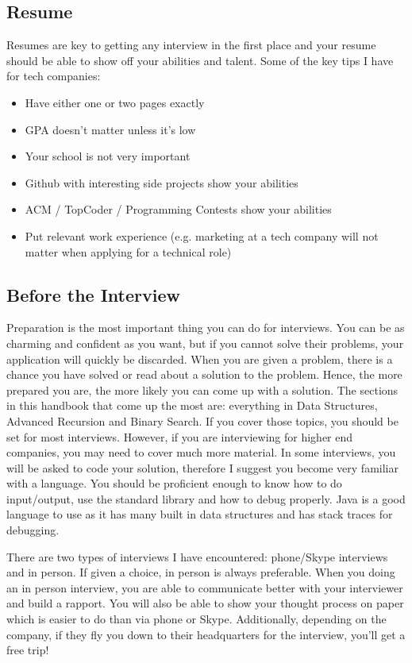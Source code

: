 \documentclass[11pt,oneside]{book}
\begin{document}
\subsection{Resume}

Resumes are key to getting any interview in the first place and your resume should be able to show off your abilities and talent. Some of the key tips I have for tech companies:

\begin{itemize}
\item Have either one or two pages exactly
\item GPA doesn't matter unless it's low
\item Your school is not very important
\item Github with interesting side projects show your abilities
\item ACM / TopCoder / Programming Contests show your abilities
\item Put relevant work experience (e.g. marketing at a tech company will not matter when applying for a technical role)
\end{itemize}

\subsection{Before the Interview}

Preparation is the most important thing you can do for interviews. You can be as charming and confident as you want, but if you cannot solve their problems, your application will quickly be discarded. When you are given a problem, there is a chance you have solved or read about a solution to the problem. Hence, the more prepared you are, the more likely you can come up with a solution. The sections in this handbook that come up the most are: everything in Data Structures, Advanced Recursion and Binary Search. If you cover those topics, you should be set for most interviews. However, if you are interviewing for higher end companies, you may need to cover much more material. In some interviews, you will be asked to code your solution, therefore I suggest you become very familiar with a language. You should be proficient enough to know how to do input/output, use the standard library and how to debug properly. Java is a good language to use as it has many built in data structures and has stack traces for debugging.

There are two types of interviews I have encountered: phone/Skype interviews and in person. If given a choice, in person is always preferable. When you doing an in person interview, you are able to communicate better with your interviewer and build a rapport. You will also be able to show your thought process on paper which is easier to do than via phone or Skype. Additionally, depending on the company, if they fly you down to their headquarters for the interview, you'll get a free trip!
\end{document}
